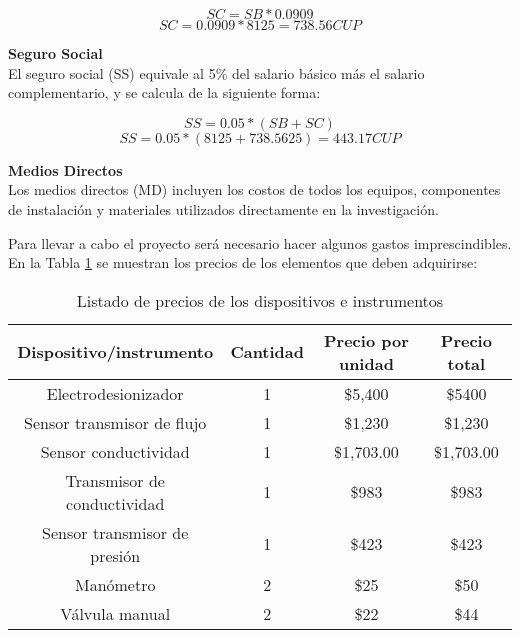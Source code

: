 \begin{equation}
    \label{eq:salary_complementary}
    SC = SB * 0.0909
\end{equation}
\begin{equation}
    \label{eq:salary_complementary_total}
    SC=0.0909*8125=738.56 CUP
\end{equation}

\textbf{Seguro Social}\\
El seguro social (SS) equivale al 5\% del salario básico más el salario complementario, y se
calcula de la siguiente forma:

\begin{equation}
    \label{eq:social_security}
    SS = 0.05 * (SB + SC)
\end{equation}
\begin{equation}
    \label{eq:social_security_total}
    SS=0.05*(8125+738.5625)=443.17 CUP
\end{equation}

\textbf{Medios Directos}\\
Los medios directos (MD) incluyen los costos de todos los equipos, componentes de instalación y
materiales utilizados directamente en la investigación.


Para llevar a cabo el proyecto será necesario hacer algunos gastos imprescindibles. En la Tabla \ref{table:precios_dispositivos_instrumentos}
se muestran los precios de los elementos que deben adquirirse:

\begin{table}[h]
    \caption{Listado de precios de los dispositivos e instrumentos}
    \label{table:precios_dispositivos_instrumentos}


    \begin{tabular}{|c|c|c|c|}
        \hline
        Dispositivo/instrumento      & Cantidad & Precio por unidad & Precio total \\
        \hline
        Electrodesionizador          & 1        & \$5,400           & \$5400       \\
        Sensor transmisor de flujo   & 1        & \$1,230           & \$1,230      \\
        Sensor conductividad         & 1        & \$1,703.00        & \$1,703.00   \\
        Transmisor de conductividad  & 1        & \$983             & \$983        \\
        Sensor transmisor de presión & 1        & \$423             & \$423        \\
        Manómetro                    & 2        & \$25              & \$50         \\
        Válvula manual               & 2        & \$22              & \$44         \\
        \hline
    \end{tabular}
\end{table}


